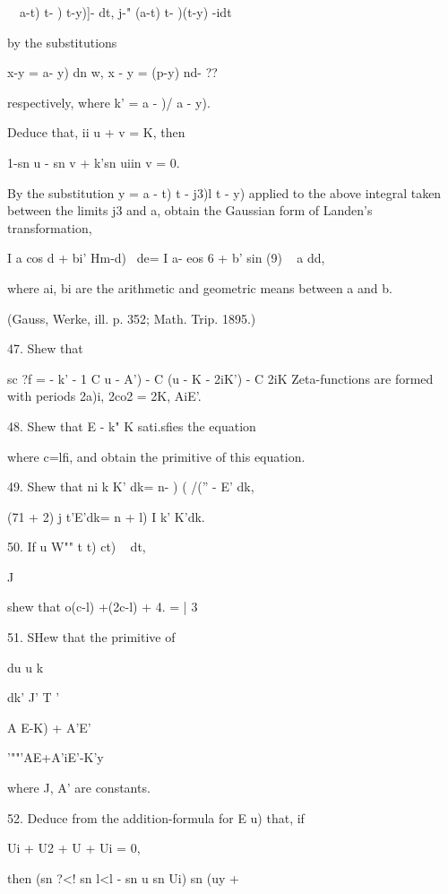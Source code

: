 \ \ a-t) t- ) t-y)]- dt, j-" (a-t) t- )(t-y) -idt

by the substitutions

x-y = a- y) dn w, x - y = (p-y) nd- ??

respectively, where k' = a - )/ a - y).

Deduce that, ii u + v = K, then

1-sn u - sn v + k'sn uiin v = 0.

By the substitution y = a - t) t - j3)l t - y) applied to the above
integral taken between the limits j3 and a, obtain the Gaussian form
of Landen's transformation,

I a cos d + bi' Hm-d)~ de= I a- eos 6 + b' sin (9) ~ a dd,

where ai, bi are the arithmetic and geometric means between a and b.

(Gauss, Werke, ill. p. 352; Math. Trip. 1895.)

%
%

47. Shew that

sc ?f = - k' - 1 C u - A') - C (u - K - 2iK') - C 2iK%
Zeta-functions are formed with periods 2a)i, 2co2 = 2K, AiE'.


48. Shew that E - k" K sati.sfies the equation

where c=lfi, and obtain the primitive of this equation.

49. Shew that ni k K' dk= n- ) ( /('' - E' dk,

(71 + 2) j t'E'dk= n + l) I k' K'dk. 

50. If u W"" t t) ct) ~ dt,

  J

shew that o(c-l) +(2c-l) + 4. = | 3

51. SHew that the primitive of

du u k \

dk' J' T '

A E-K) + A'E'


'""'AE+A'iE'-K'y

where J, A' are constants. 

52. Deduce from the addition-formula for E u) that, if

Ui + U2 + U + Ui = 0,

then (sn ?<! sn l<l - sn u sn Ui) sn (uy + %

